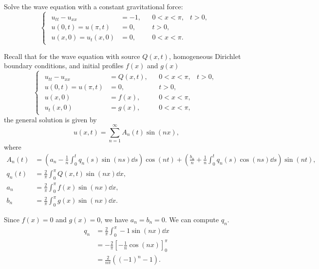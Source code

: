 \documentclass[plain]{pset}
\begin{document}
\begin{problem}
Solve the wave equation with a constant gravitational force:
\[
    \begin{cases}
        \begin{aligned}
            u_{tt} - u_{xx}              & = -1, &  & 0 < x < \pi, & t > 0, \\
            u(0, t)          = u(\pi, t) & = 0,  &  & t > 0,                \\
            u(x, 0)          = u_t(x, 0) & = 0,  &  & 0 < x < \pi.
        \end{aligned}
    \end{cases}
\]
\end{problem}
\begin{solution}
    Recall that for the wave equation with source \(Q(x,t)\), homogeneous Dirichlet boundary conditions, and initial profiles \(f(x)\) and \(g(x)\)
    \[
        \begin{cases}
            \begin{aligned}
                u_{tt} - u_{xx}     & = Q(x,t), &  & 0 < x < \pi, & t > 0, \\
                u(0, t) = u(\pi, t) & = 0,      &  & t > 0,                \\
                u(x, 0)             & = f(x),   &  & 0 < x < \pi,          \\
                u_t(x, 0)           & = g(x),   &  & 0 < x < \pi,
            \end{aligned}
        \end{cases}
    \]
    the general solution is given by
    \[u(x,t) = \sum_{n=1}^\infty A_n(t)\sin(nx),\]
    where
    \begin{align*}
        A_n(t) & = \left(a_n - \frac{1}{n}\int_0^t q_n(s)\sin(ns) \dd{s}\right)\cos(nt) + \left(\frac{b_n}{n} + \frac{1}{n}\int_0^t q_n(s)\cos(ns) \dd{s}\right)\sin(nt), \\
        q_n(t) & = \frac{2}{\pi}\int_0^\pi Q(x,t)\sin(nx) \dd{x},                                                                                                         \\
        a_n    & = \frac{2}{\pi}\int_0^\pi f(x)\sin(nx) \dd{x},                                                                                                           \\
        b_n    & = \frac{2}{\pi}\int_0^\pi g(x)\sin(nx) \dd{x}.
    \end{align*}

    Since \(f(x) = 0\) and \(g(x) = 0\), we have \(a_n = b_n = 0\). We can compute \(q_n\).
    \begin{align*}
        q_n & = \frac{2}{\pi}\int_0^\pi -1\sin(nx) \dd{x}             \\
            & = -\frac{2}{\pi}\left[-\frac{1}{n}\cos(nx)\right]_0^\pi \\
            & = \frac{2}{n\pi}\left((-1)^n - 1\right).
    \end{align*}


\end{solution}
\end{document}

